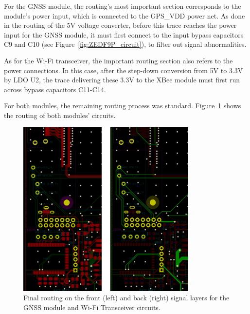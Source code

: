 For the GNSS module, the routing's most important section corresponds to the module's power input, which is connected to the GPS\_VDD power net. As done in the routing of the 5V voltage converter, before this trace reaches the power input for the GNSS module, it must first connect to the input bypass capacitors C9 and C10 (see Figure~\ref{fig:ZEDF9P_circuit}), to filter out signal abnormalities.

As for the Wi-Fi transceiver, the important routing section also refers to the power connections. In this case, after the step-down conversion from 5V to 3.3V by LDO U2, the trace delivering these 3.3V to the XBee module must first run across bypass capacitors C11-C14.

For both modules, the remaining routing process was standard. Figure~\ref{fig:6_routing_ZED_XBee} shows the routing of both modules' circuits.

\begin{figure}[h]
	\centering
	\includegraphics[width=0.8\textwidth]{Chapters/Figures/chapter5/6_routing_ZED_XBee.png}
	\caption{Final routing on the front (left) and back (right) signal layers for the GNSS module and Wi-Fi Transceiver circuits.}
	\label{fig:6_routing_ZED_XBee}
\end{figure}

